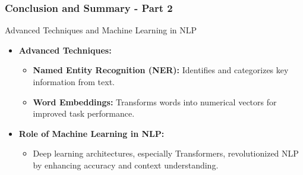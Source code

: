 \documentclass[aspectratio=169]{beamer}
\begin{document}
\begin{frame}[fragile]
    \frametitle{Conclusion and Summary - Part 2}
    \begin{block}{Advanced Techniques and Machine Learning in NLP}
        \begin{itemize}
            \item \textbf{Advanced Techniques:}
            \begin{itemize}
                \item \textbf{Named Entity Recognition (NER):} Identifies and categorizes key information from text.
                \item \textbf{Word Embeddings:} Transforms words into numerical vectors for improved task performance.
            \end{itemize}
            
            \item \textbf{Role of Machine Learning in NLP:}
            \begin{itemize}
                \item Deep learning architectures, especially Transformers, revolutionized NLP by enhancing accuracy and context understanding.
            \end{itemize}
        \end{itemize}
    \end{block}
\end{frame}
\end{document}
